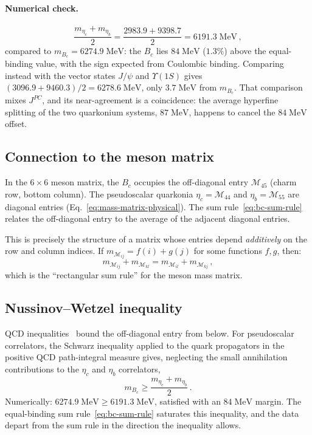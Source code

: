 \documentclass[11pt,a4paper]{article}
\theoremstyle{plain}
\begin{document}
\paragraph{Numerical check.}
\begin{equation}
  \frac{m_{\eta_c} + m_{\eta_b}}{2}
  = \frac{2983.9 + 9398.7}{2} = 6191.3\;\text{MeV}\,,
\end{equation}
compared to $m_{B_c} = 6274.9\;\text{MeV}$: the $B_c$ lies
$84\;\text{MeV}$ ($1.3\%$) above the equal-binding value, with the sign
expected from Coulombic binding.  Comparing instead with the vector
states $J/\psi$ and $\Upsilon(1S)$ gives
$(3096.9 + 9460.3)/2 = 6278.6\;\text{MeV}$, only $3.7\;\text{MeV}$ from
$m_{B_c}$.  That comparison mixes $J^{PC}$, and its near-agreement is a
coincidence: the average hyperfine splitting of the two quarkonium
systems, $87\;\text{MeV}$, happens to cancel the $84\;\text{MeV}$
offset.

\subsection{Connection to the meson matrix}

In the $6 \times 6$ meson matrix, the $B_c$ occupies the off-diagonal
entry $\mathcal{M}_{45}$ (charm row, bottom column).  The pseudoscalar
quarkonia $\eta_c = \mathcal{M}_{44}$ and $\eta_b = \mathcal{M}_{55}$
are diagonal entries (Eq.~\eqref{eq:mass-matrix-physical}).  The sum rule~\eqref{eq:bc-sum-rule} relates the
off-diagonal entry to the average of the adjacent diagonal entries.

This is precisely the structure of a matrix whose entries depend
\emph{additively} on the row and column indices.  If
$m_{\mathcal{M}_{ij}} = f(i) + g(j)$ for some functions $f,g$, then:
\begin{equation}\label{eq:additive-matrix}
  m_{\mathcal{M}_{ij}} + m_{\mathcal{M}_{kl}}
  = m_{\mathcal{M}_{il}} + m_{\mathcal{M}_{kj}}\,,
\end{equation}
which is the ``rectangular sum rule'' for the meson mass matrix.

\subsection{Nussinov--Wetzel inequality}

QCD inequalities~\cite{NussinovWetzel1983} bound the off-diagonal
entry from below.  For pseudoscalar correlators, the Schwarz inequality
applied to the quark propagators in the positive QCD path-integral
measure gives, neglecting the small annihilation contributions to the
$\eta_c$ and $\eta_b$ correlators,
\begin{equation}\label{eq:nw-inequality}
  m_{B_c} \geq \frac{m_{\eta_c} + m_{\eta_b}}{2}\,.
\end{equation}
Numerically: $6274.9\;\text{MeV} \geq 6191.3\;\text{MeV}$, satisfied
with an $84\;\text{MeV}$ margin.  The equal-binding sum
rule~\eqref{eq:bc-sum-rule} saturates this inequality, and the data
depart from the sum rule in the direction the inequality allows.
\end{document}
